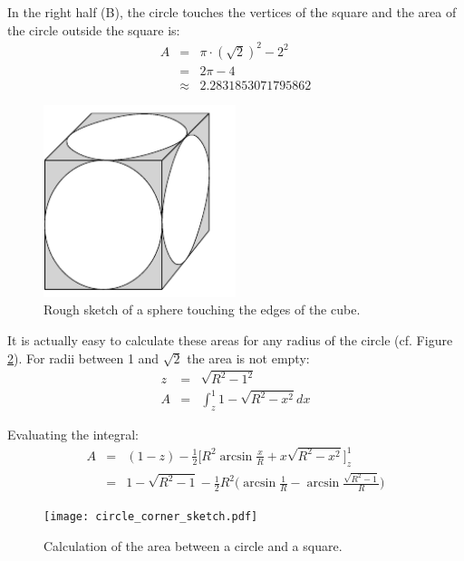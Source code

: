 \documentclass[onecolumn]{article}
\begin{document}
In the right half (B), the circle touches the vertices of the square and the area of the circle
outside the square is:
\begin{eqnarray}
\nonumber    A &=& \pi \cdot (\sqrt{2})^2 - 2^2 \\
\nonumber      &=& 2\pi - 4 \\
\nonumber      &\approx& 2.2831853071795862
\end{eqnarray}

\begin{figure}[H]
\caption{Rough sketch of a sphere touching the edges of the cube.}
\label{sphere_cube}
\begin{center}
\includegraphics[width=0.5\textwidth]{sphere_cube_sketch.pdf}
\end{center}
\end{figure}

It is actually easy to calculate these areas for any radius of the circle (cf. Figure \ref{corner}). For
radii between 1 and $\sqrt{2}$ the area is not empty:
\begin{eqnarray}
\nonumber  z &=& \sqrt{R^2 - 1^2} \\
\nonumber  A &=& \int_z^1 1-\sqrt{R^2 - x^2} dx
\end{eqnarray}

Evaluating the integral:
\begin{eqnarray}
\nonumber  A &=& (1-z) -\frac{1}{2} \bigl [R^2 \arcsin{\frac{x}{R}} + x \sqrt{R^2 - x^2} \bigr]_z^1  \\
\nonumber    &=& 1 - \sqrt{R^2-1} - \frac{1}{2} R^2 \bigl (\arcsin{\frac{1}{R}} - \arcsin{\frac{\sqrt{R^2-1}}{R}} \bigr)
\end{eqnarray}


\begin{figure}[H]
\caption{Calculation of the area between a circle and a square.}
\label{corner}
\begin{center}
\texttt{[image: circle\_corner\_sketch.pdf]}
\end{center}
\end{figure}
\end{document}
